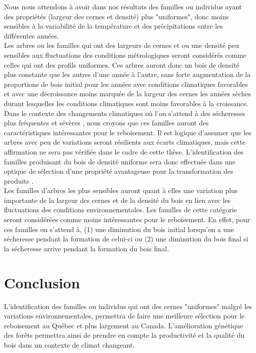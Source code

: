 \documentclass[a4paper,12pt]{report}
\begin{document}
Nous nous attendons à avoir dans nos résultats des familles ou individus ayant des propriétés (largeur des cernes et densité) plus "uniformes", donc moins sensibles à la variabilité de la température et des précipitations entre les différentes années.\\ 

Les arbres ou les familles qui ont des largeurs de cernes et ou une densité peu sensibles aux fluctuations des conditions métrologiques seront considérés comme celles qui ont des profils uniformes. Ces arbres auront donc un bois de densité plus constante que les autres d'une année à l'autre, sans forte augmentation de la proportions de bois initial pour les années avec conditions climatiques favorables et avec une décroissance moins marquée de la largeur des cernes les années sèches durant lesquelles les conditions climatiques sont moins favorables à la croissance. Dans le contexte des changements climatiques où l'on s'attend à des sécheresses plus fréquentes et sévères \citep{IPCC_2015}, nous croyons que ces familles auront des caractéristiques intéressantes pour le reboisement. Il est logique d'assumer que les arbres avec peu de variations seront résilients aux écarts climatiques, mais cette affirmation ne sera pas vérifiée dans le cadre de cette thèse. L'identification des familles produisant du bois de densité uniforme sera donc effectuée dans une optique de sélection d'une propriété avantageuse pour la transformation des produits \citep{Hernandez2001}. \\ 

Les familles d'arbres les plus sensibles auront quant à elles une variation plus importante de la largeur des cernes et de la densité du bois en lien avec les fluctuations des conditions environnementales. Les familles de cette catégorie seront considérées comme moins intéressantes pour le reboisement. En effet, pour ces familles on s'attend à, (1) une diminution du bois initial lorsqu'on a une sécheresse pendant la formation de celui-ci ou (2) une diminution du bois final si la sécheresse arrive pendant la formation du bois final.\\


\section{Conclusion}

L'identification des familles ou individus qui ont des cernes "uniformes" malgré les variations environnementales, permettra de faire une meilleure sélection pour le reboisement au Québec et plus largement au Canada. L'amélioration génétique des forêts permettra ainsi de prendre en compte la productivité et la qualité du bois dans un contexte de climat changeant.\\
\end{document}
